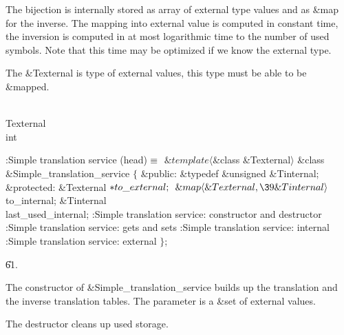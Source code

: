 The bijection is internally stored as array of external type values and
as \&{map} for the inverse. The mapping into external value is computed in
constant time, the inversion is computed in at most logarithmic time to
the number of used symbols. Note that this time may be optimized if we
know the external type.

The \&{Texternal} is type of external values, this type must be able to be
\&{map}ped.

\Y\B\F\\{Texternal} \5
\\{int}\par
\Y\B\4:Simple translation service (head)\X${}\equiv{}$\6
$\&{template}\langle{}$\&{class} \&{Texternal}${}\rangle{}$\6
\&{class} \&{Simple\_translation\_service} ${}\{{}$\1\6
\4\&{public}:\6
\&{typedef} \&{unsigned} \&{Tinternal};\6
\4\&{protected}:\6
\&{Texternal} ${}{*}\\{to\_external};{}$\6
${}\&{map}\langle\&{Texternal},\39\&{Tinternal}\rangle{}$ \\{to\_internal};\6
\&{Tinternal} \\{last\_used\_internal};\7
:Simple translation service: constructor and destructor\X\6
:Simple translation service: gets and sets\X\6
:Simple translation service: internal\X\6
:Simple translation service: external\X\2\6
${}\}{}$;\par
\U61.\fi

The constructor of \&{Simple\_translation\_service} builds up the
translation and the inverse translation tables. The parameter is a \&{set}
of external values.

The destructor cleans up used storage.

